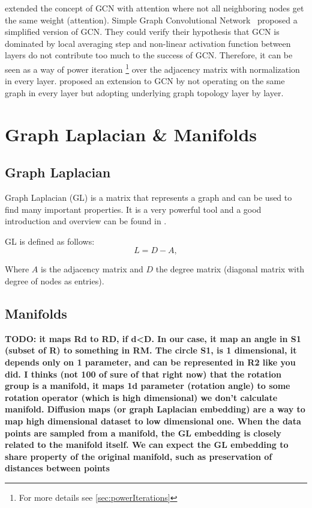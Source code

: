 \citet{GAT} extended the concept of GCN with attention where not all neighboring nodes get the same weight (attention).
Simple Graph Convolutional Network~\cite{simpleGCN} proposed a simplified version of GCN.
They could verify their hypothesis that GCN is dominated by local averaging step and non-linear 
activation function between layers do not contribute too much to the success of GCN. 
Therefore, it can be seen as a way of power iteration \footnote{For more details see \ref{sec:powerIterations}}
over the adjacency matrix with normalization in every layer.
\citet{dynamicGCN} proposed an extension to GCN by not operating on the same graph in every layer but adopting
underlying graph topology layer by layer.

\section{Graph Laplacian \& Manifolds}
\subsection{Graph Laplacian}
Graph Laplacian (GL) is a matrix that represents a graph and can be used to find many important properties.
It is a very powerful tool and a good introduction and overview can be found in \cite{tutorialSpectralClustering, SpectralGraphTheory}. 

GL is defined as follows:
\begin{equation}
    \label{eq:gl}
    L = D - A,
\end{equation}

Where $A$ is the adjacency matrix and $D$ the degree matrix (diagonal matrix with degree of nodes as entries).

\subsection{Manifolds}
\label{sec:manifolds}

\textbf{TODO:
it maps Rd to RD, if d<D. 
In our case, it map an angle in S1 (subset of R) to something in RM. The circle S1, is 1 dimensional, 
it depends only on 1 parameter, and can be represented in R2 like you did. 
I thinks (not 100 of sure of that right now) that the  rotation group is a manifold, 
it maps 1d parameter (rotation angle) to some rotation operator (which is high dimensional)
we don't calculate manifold. 
Diffusion maps (or graph Laplacian embedding) are a way to map high dimensional dataset to low dimensional one. 
When the data points are sampled from a manifold, the GL embedding is closely related to the manifold itself.
We can expect the GL embedding to share property of the original manifold, such as preservation of distances between points}



